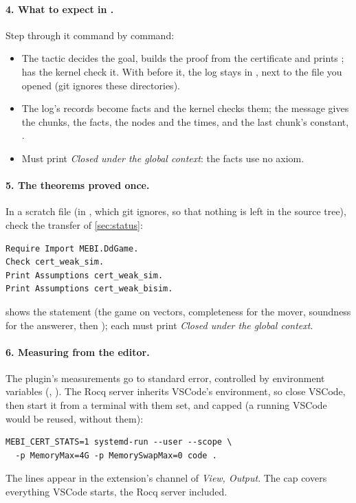 \paragraph{4. What to expect in .} Step through it command
by command:
\begin{itemize}
\item {} The tactic decides the goal,
  builds the proof from the certificate and prints ;  has the kernel check it. With  before it, the log stays in
  , next to the file you opened
  (git ignores these directories).
\item {} The log's records
  become facts and the kernel checks them; the message gives the chunks,
  the facts, the nodes and the times, and the last chunk's constant,
  .
\item {} Must print \emph{Closed under
  the global context}: the facts use no axiom.
\end{itemize}

\paragraph{5. The theorems proved once.} In a scratch file (in
, which git ignores, so that nothing is left in the source
tree), check the transfer of \cref{sec:status}:
\begin{verbatim}
Require Import MEBI.DdGame.
Check cert_weak_sim.
Print Assumptions cert_weak_sim.
Print Assumptions cert_weak_bisim.
\end{verbatim}
 shows the statement (the game on vectors, completeness for
the mover, soundness for the answerer, then ); each
 must print \emph{Closed under the global
context}.

\paragraph{6. Measuring from the editor.} The plugin's measurements go to
standard error, controlled by environment variables
(, ). The Rocq server inherits
VSCode's environment, so close VSCode, then start it from a terminal with
them set, and capped (a running VSCode would be reused, without them):
\begin{verbatim}
MEBI_CERT_STATS=1 systemd-run --user --scope \
  -p MemoryMax=4G -p MemorySwapMax=0 code .
\end{verbatim}
The lines appear in the extension's channel of \emph{View, Output}. The cap
covers everything VSCode starts, the Rocq server included.

